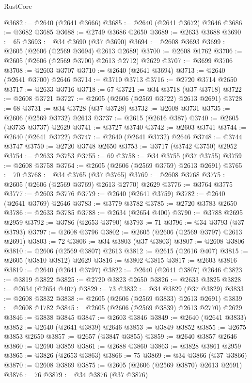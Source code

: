 \begin{lexlean}{RustCore}
\begin{coremodule}
@3682 := @2640 (@2641 @3666)
@3685 := @2640 (@2641 @3672) @2646
@3686 := @3682 @3685
@3688 := @2749 @3686 @2650
@3689 := @2633 @3688
@3690 := 65
@3693 := @34 @3690 (@37 @3690)
@3694 := @2608 @3693
@3699 := @2605 (@2606 (@2569 @3694) @2613 @2689)
@3700 := @2608 @1762
@3706 := @2605 (@2606 (@2569 @3700) @2613 @2712) @2629
@3707 := @3699 @3706
@3708 := @2603 @3707
@3710 := @2640 (@2641 @3694)
@3713 := @2640 (@2641 @3700) @2646
@3714 := @3710 @3713
@3716 := @2720 @3714 @2650
@3717 := @2633 @3716
@3718 := 67
@3721 := @34 @3718 (@37 @3718)
@3722 := @2608 @3721
@3727 := @2605 (@2606 (@2569 @3722) @2613 @2691)
@3728 := 68
@3731 := @34 @3728 (@37 @3728)
@3732 := @2608 @3731
@3735 := @2606 (@2569 @3732) @2613
@3737 := @2615 (@2616 @387)
@3740 := @2605 (@3735 @3737) @2629
@3741 := @3727 @3740
@3742 := @2603 @3741
@3744 := @2640 (@2641 @3722)
@3747 := @2640 (@2641 @3732) @2646
@3748 := @3744 @3747
@3750 := @2720 @3748 @2650
@3753 := @3717 (@3742 @3750) @2952
@3754 := @2633 @3753
@3755 := 69
@3758 := @34 @3755 (@37 @3755)
@3759 := @2608 @3758
@3764 := @2605 (@2606 (@2569 @3759) @2613 @2691)
@3765 := 70
@3768 := @34 @3765 (@37 @3765)
@3769 := @2608 @3768
@3775 := @2605 (@2606 (@2569 @3769) @2613 @2770) @2629
@3776 := @3764 @3775
@3777 := @2603 @3776
@3779 := @2640 (@2641 @3759)
@3782 := @2640 (@2641 @3769) @2646
@3783 := @3779 @3782
@3785 := @2720 @3783 @2650
@3786 := @2633 @3785
@3788 := @2634 (@2654 @400)
@3790 := @3788 @2695 @2959
@3792 := @3786 (@2653 @3790)
@3793 := 71
@3796 := @34 @3793 (@37 @3793)
@3797 := @2608 @3796
@3802 := @2605 (@2606 (@2569 @3797) @2613 @2691)
@3803 := 72
@3806 := @34 @3803 (@37 @3803)
@3807 := @2608 @3806
@3810 := @2606 (@2569 @3807) @2613
@3812 := @2615 (@2616 @407)
@3815 := @2605 (@3810 @3812) @2629
@3816 := @3802 @3815
@3817 := @2603 @3816
@3819 := @2640 (@2641 @3797)
@3822 := @2640 (@2641 @3807) @2646
@3823 := @3819 @3822
@3825 := @2720 @3823 @2650
@3826 := @2633 @3825
@3828 := @2634 (@2654 @407)
@3829 := 73
@3832 := @34 @3829 (@37 @3829)
@3833 := @2608 @3832
@3838 := @2605 (@2606 (@2569 @3833) @2613 @2691)
@3839 := @2608 @1782
@3845 := @2605 (@2606 (@2569 @3839) @2613 @2770) @2629
@3846 := @3838 @3845
@3847 := @2603 @3846
@3849 := @2640 (@2641 @3833)
@3852 := @2640 (@2641 @3839) @2646
@3853 := @3849 @3852
@3855 := @2675 @3853 @2650
@3857 := @2657 (@3847 @3855)
@3859 := @2640 @3857 @2646
@3860 := @2690 @3859
@3861 := @2688 @3860
@3863 := @3828 @3861 @2959
@3865 := @3826 (@2653 @3863)
@3866 := 75
@3869 := @34 @3866 (@37 @3866)
@3870 := @2608 @3869
@3875 := @2605 (@2606 (@2569 @3870) @2613 @2691)
@3876 := 76
@3879 := @34 @3876 (@37 @3876)

\end{coremodule}
\end{lexlean}
